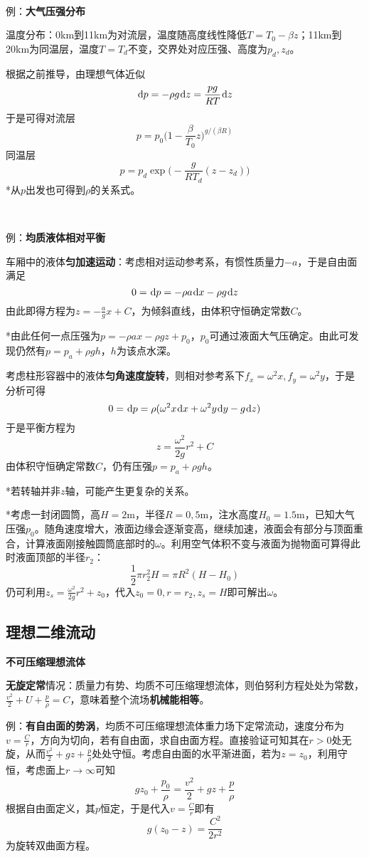 \documentclass[a4paper,UTF8,fontset=windows]{ctexart}
\newcommand*{\dr}{\hspace{0.07em}\mathrm{d}}
\begin{document}
\

例：\textbf{大气压强分布}

温度分布：0km到11km为对流层，温度随高度线性降低$T=T_0-\beta z$；11km到20km为同温层，温度$T=T_d$不变，交界处对应压强、高度为$p_d,z_d$。

根据之前推导，由理想气体近似
$$\dr p=-\rho g\dr z=\frac{pg}{RT}\dr z$$
于是可得对流层
$$p=p_0\bigg(1-\frac{\beta}{T_0}z\bigg)^{g/(\beta R)}$$
同温层
$$p=p_d\exp\bigg(-\frac{g}{RT_d}(z-z_d)\bigg)$$
*从$p$出发也可得到$\rho$的关系式。

\

例：\textbf{均质液体相对平衡}

车厢中的液体\textbf{匀加速运动}：考虑相对运动参考系，有惯性质量力$-a$，于是自由面满足
$$0=\dr p=-\rho a\dr x-\rho g\dr z$$
由此即得方程为$z=-\frac{a}{g}x+C$，为倾斜直线，由体积守恒确定常数$C$。

*由此任何一点压强为$p=-\rho ax-\rho gz+p_0$，$p_0$可通过液面大气压确定。由此可发现仍然有$p=p_a+\rho gh$，$h$为该点水深。

考虑柱形容器中的液体\textbf{匀角速度旋转}，则相对参考系下$f_x=\omega^2x,f_y=\omega^2y$，于是分析可得
$$0=\dr p=\rho(\omega^2x\dr x+\omega^2y\dr y-g\dr z)$$
于是平衡方程为
$$z=\frac{\omega^2}{2g}r^2+C$$
由体积守恒确定常数$C$，仍有压强$p=p_a+\rho gh$。

*若转轴并非$z$轴，可能产生更复杂的关系。

*考虑一封闭圆筒，高$H=2\mathrm{m}$，半径$R=0,5\mathrm{m}$，注水高度$H_0=1.5\mathrm{m}$，已知大气压强$p_0$。随角速度增大，液面边缘会逐渐变高，继续加速，液面会有部分与顶面重合，计算液面刚接触圆筒底部时的$\omega$。利用空气体积不变与液面为抛物面可算得此时液面顶部的半径$r_2$：
$$\frac{1}{2}\pi r_2^2H=\pi R^2(H-H_0)$$
仍可利用$z_s=\frac{\omega^2}{2g}r^2+z_0$，代入$z_0=0,r=r_2,z_s=H$即可解出$\omega$。

\subsection{理想二维流动}
\textbf{不可压缩理想流体}

\textbf{无旋定常}情况：质量力有势、均质不可压缩理想流体，则伯努利方程处处为常数，$\frac{v^2}{2}+U+\frac{p}{\rho}=C$，意味着整个流场\textbf{机械能相等}。

例：\textbf{有自由面的势涡}，均质不可压缩理想流体重力场下定常流动，速度分布为$v=\frac{C}{r}$，方向为切向，若有自由面，求自由面方程。直接验证可知其在$r>0$处无旋，从而$\frac{v^2}{2}+gz+\frac{p}{\rho}$处处守恒。考虑自由面的水平渐进面，若为$z=z_0$，利用守恒，考虑面上$r\to\infty$可知
$$gz_0+\frac{p_0}{\rho}=\frac{v^2}{2}+gz+\frac{p}{\rho}$$
根据自由面定义，其$p$恒定，于是代入$v=\frac{C}{r}$即有
$$g(z_0-z)=\frac{C^2}{2r^2}$$
为旋转双曲面方程。
\end{document}
